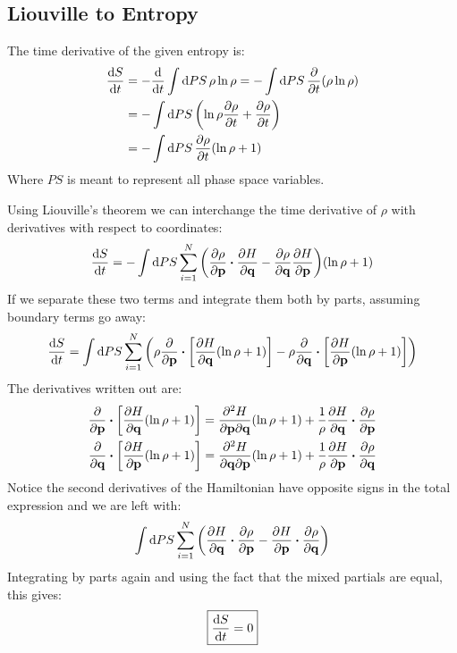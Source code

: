 \documentclass[12pt]{article}
\begin{document}
\subsection{Liouville to Entropy}
The time derivative of the given entropy is:
\begin{align*}
  \dv{S}{t}&=-\dv{t}\int\dd{PS}\rho\ln\rho
  =-\int\dd{PS}\pdv{t}\qty(\rho\ln\rho)\\
  &=-\int\dd{PS}\qty(\ln\rho\pdv{\rho}{t}+\pdv{\rho}{t})\\
  &=-\int\dd{PS}\pdv{\rho}{t}\qty(\ln\rho+1)
\end{align*}
Where $PS$ is meant to represent all phase space variables.

Using Liouville's theorem we can interchange the time derivative of $\rho$ with derivatives with respect to coordinates:
\begin{align*}
  \dv{S}{t}=-\int\dd{PS}\sum_{i=1}^N\qty(\pdv{\rho}{\vb{p}}\vdot\pdv{H}{\vb{q}}
  -\pdv{\rho}{\vb{q}}\pdv{H}{\vb{p}})\qty(\ln\rho+1)
\end{align*}
If we separate these two terms and integrate them both by parts, assuming boundary terms go away:
\begin{align*}
  \dv{S}{t}=\int\dd{PS}\sum_{i=1}^N\qty(
  \rho\pdv{\vb{p}}\vdot\qty[\pdv{H}{\vb{q}}\qty(\ln\rho+1)]
  -\rho\pdv{\vb{q}}\vdot\qty[\pdv{H}{\vb{p}}\qty(\ln\rho+1)])
\end{align*}
The derivatives written out are:
\begin{align*}
  \pdv{\vb{p}}\vdot\qty[\pdv{H}{\vb{q}}\qty(\ln\rho+1)]=
  \pdv{H}{\vb{p}}{\vb{q}}\qty(\ln\rho+1)
  +\frac1\rho\pdv{H}{\vb{q}}\vdot\pdv{\rho}{\vb{p}}\\
  \pdv{\vb{q}}\vdot\qty[\pdv{H}{\vb{p}}\qty(\ln\rho+1)]=
  \pdv{H}{\vb{q}}{\vb{p}}\qty(\ln\rho+1)
  +\frac1\rho\pdv{H}{\vb{p}}\vdot\pdv{\rho}{\vb{q}}\\
\end{align*}
Notice the second derivatives of the Hamiltonian have opposite signs in the total expression and we are left with:
\begin{align*}
  \int\dd{PS}\sum_{i=1}^N\qty(\pdv{H}{\vb{q}}\vdot\pdv{\rho}{\vb{p}}
  -\pdv{H}{\vb{p}}\vdot\pdv{\rho}{\vb{q}})
\end{align*}
Integrating by parts again and using the fact that the mixed partials are equal, this gives:
\begin{align}
  \boxed{\dv{S}{t}=0}
\end{align}
\end{document}
